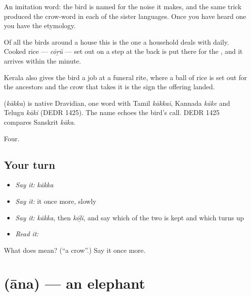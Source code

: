 An imitation word: the bird is named for the noise it makes, and the same trick produced the crow-word in each of the sister languages. Once you have heard one you have the etymology.

Of all the birds around a house this is the one a household deals with daily. Cooked rice — \emph{cōṟŭ} — set out on a step at the back is put there for the , and it arrives within the minute.

Kerala also gives the bird a job at a funeral rite, where a ball of rice is set out for the ancestors and the crow that takes it is the sign the offering landed.

\begin{cousinweb}
\textbf{} (\emph{kākka}) is native Dravidian, one word with Tamil \emph{kākkai}, Kannada \emph{kāke} and Telugu \emph{kāki} (DEDR 1425). The name echoes the bird's call. DEDR 1425 compares Sanskrit \emph{kāka}.
\end{cousinweb}

\begin{grammarlens}[title={What you've built}]
Four.
\end{grammarlens}

\subsection*{Your turn}
\begin{itemize}
\raggedright
  \item \emph{Say it:} \emph{kākka}
  \item \emph{Say it:} it once more, slowly
  \item \emph{Say it:} \emph{kākka}, then \emph{kōḻi}, and say which of the two is kept and which turns up
  \item \emph{Read it:} \textbf{}
\end{itemize}

\begin{tcolorbox}[breakable,colback=teal!4,colframe=teal!35!black,title={Before you move on}]
What does  mean? (\textquotedblleft{}a crow\textquotedblright{}.) Say it once more.
\end{tcolorbox}
\section[\texorpdfstring{\ml{ആന} (āna)}{ആന (āna)}]{ (āna) — an elephant}

\label{lesson:ML-C60-elephant}



